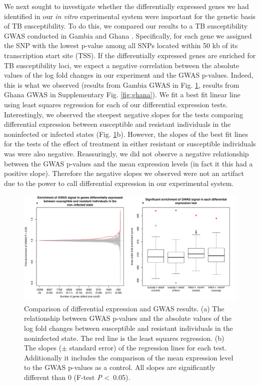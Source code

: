 \documentclass[fleqn,10pt]{wlscirep}
\begin{document}
We next sought to investigate whether the differentially expressed genes we had identified in our \emph{in vitro} experimental system were important for the genetic basis of TB susceptibility. To do this, we compared our results to a TB susceptibility GWAS conducted in Gambia and Ghana \cite{Thye2010}. Specifically, for each gene we assigned the SNP with the lowest p-value among all SNPs located within 50 kb of its transcription start site (TSS). If the differentially expressed genes are enriched for TB susceptibility loci, we expect a negative correlation between the absolute values of the log fold changes in our experiment and the GWAS p-values. Indeed, this is what we observed (results from Gambia GWAS in Fig. \ref{fig:gwas}, results from Ghana GWAS in Supplementary Fig. \ref{fig:ghana}). We fit a best fit linear line using least squares regression for each of our differential expression tests. Interestingly, we observed the steepest negative slopes for the tests comparing differential expression between susceptible and resistant individuals in the noninfected or infected states (Fig. \ref{fig:gwas}b). However, the slopes of the best fit lines for the tests of the effect of treatment in either resistant or susceptible individuals was were also negative. Reassuringly, we did not observe a negative relationship between the GWAS p-values and the mean expression levels (in fact it this had a positive slope). Therefore the negative slopes we observed were not an artifact due to the power to call differential expression in our experimental system.

\begin{figure}[ht]
\centering
\includegraphics[width=\linewidth]{../figure/gwas.pdf}
\caption{
Comparison of differential expression and GWAS results. (a) The relationship between GWAS p-values \cite{Thye2010} and the absolute values of the log fold changes between susceptible and resistant individuals in the noninfected state. The red line is the least squares regression. (b) The slopes ($\pm$ standard error) of the regression lines for each test. Additionally it includes the comparison of the mean expression level to the GWAS p-values as a control. All slopes are significantly different than 0 (F-test \emph{P} \textless \, 0.05).
}
\label{fig:gwas}
\end{figure}
\end{document}
